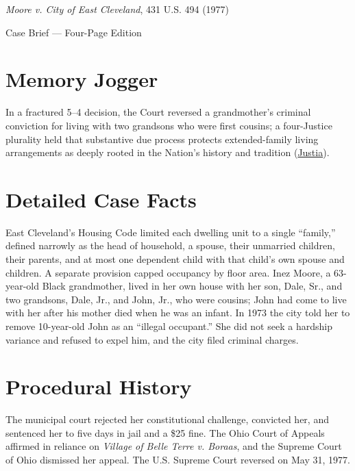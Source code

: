 \documentclass[12pt]{article}
\begin{document}
\begin{center}
{\LARGE \textit{Moore v. City of East Cleveland}, 431 U.S. 494 (1977)\par}
\vspace{0.8em}
{\large Case Brief --- Four-Page Edition\par}
\end{center}
\vspace{1em}

\section{Memory Jogger}

In a fractured 5--4 decision, the Court reversed a grandmother's criminal conviction for living with two grandsons who were first cousins; a four-Justice plurality held that substantive due process protects extended-family living arrangements as deeply rooted in the Nation's history and tradition (\href{https://supreme.justia.com/cases/federal/us/431/494/}{Justia}).

\section{Detailed Case Facts}

East Cleveland's Housing Code limited each dwelling unit to a single ``family,'' defined narrowly as the head of household, a spouse, their unmarried children, their parents, and at most one dependent child with that child's own spouse and children. A separate provision capped occupancy by floor area. Inez Moore, a 63-year-old Black grandmother, lived in her own house with her son, Dale, Sr., and two grandsons, Dale, Jr., and John, Jr., who were cousins; John had come to live with her after his mother died when he was an infant. In 1973 the city told her to remove 10-year-old John as an ``illegal occupant.'' She did not seek a hardship variance and refused to expel him, and the city filed criminal charges.

\section{Procedural History}

The municipal court rejected her constitutional challenge, convicted her, and sentenced her to five days in jail and a \$25 fine. The Ohio Court of Appeals affirmed in reliance on \textit{Village of Belle Terre v. Boraas}, and the Supreme Court of Ohio dismissed her appeal. The U.S. Supreme Court reversed on May 31, 1977.
\end{document}
